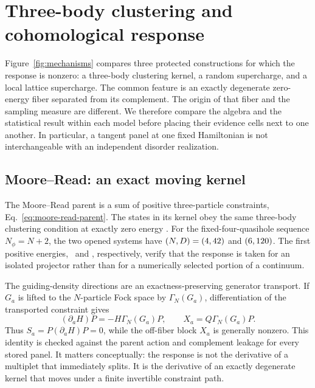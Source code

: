\section{Three-body clustering and cohomological response}
\label{sec:cohomology}

Figure~\ref{fig:mechanisms} compares three protected constructions for which
the response is nonzero: a three-body clustering kernel, a random
supercharge, and a local lattice supercharge.  The common feature is an
exactly degenerate zero-energy fiber separated from its complement.  The
origin of that fiber and the sampling measure are different.  We therefore
compare the algebra and the statistical result within each model before
placing their evidence cells next to one another.  In particular, a tangent
panel at one fixed Hamiltonian is not interchangeable with an independent
disorder realization.

\subsection{Moore--Read: an exact moving kernel}

The Moore--Read parent is a sum of positive three-particle constraints,
Eq.~\eqref{eq:moore-read-parent}.  The states in its kernel obey the same
three-body clustering condition at exactly zero energy
\cite{mooreread1991,zhang2023parent}.  For the fixed-four-quasihole sequence
$N_\phi=N+2$, the two opened systems have $(N,D)=(4,
42)$ and $(6,120)$.  The first positive
energies, \MooreReadNFourExternalGap\ and
\MooreReadNSixExternalGap, respectively, verify that the response is taken
for an isolated projector rather than for a numerically selected portion of
a continuum.

The guiding-density directions are an exactness-preserving generator
transport.  If $G_a$ is lifted to the $N$-particle Fock space by
$\Gamma_N(G_a)$, differentiation of the transported constraint gives
\begin{equation}
 (\partial_aH)P=-H\Gamma_N(G_a)P,
 \qquad
 X_a=Q\Gamma_N(G_a)P.
 \label{eq:mr-generator-response}
\end{equation}
Thus $S_a=P(\partial_aH)P=0$, while the off-fiber block $X_a$ is generally
nonzero.  This identity is checked against the parent action and complement
leakage for every stored panel.  It matters conceptually: the response is not
the derivative of a multiplet that immediately splits.  It is the derivative
of an exactly degenerate kernel that moves under a finite invertible
constraint path.

